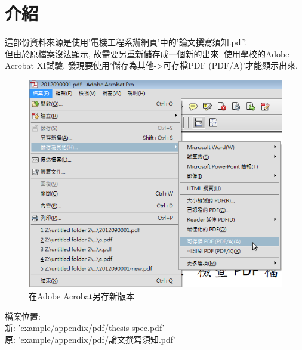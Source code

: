 
\section{介紹}
這部份資料來源是使用'電機工程系辦網頁'中的'論文撰寫須知.pdf'\cite{web:ncku:thesis-need-to-know}.\\

但由於原檔案沒法顯示, 故需要另重新儲存成一個新的出來. 使用學校的Adobe Acrobat XI試驗, 發現要使用'儲存為其他->可存檔PDF (PDF/A)'才能顯示出來.\\

\begin{figure}[h]
  \centering
  \includegraphics[scale=0.3]{./example/appendix/pic/save_pdf.png}
  \caption{在Adobe Acrobat另存新版本}
  \label{fig:appendix:save_pdf}
\end{figure}

檔案位置:\\
新: 'example/appendix/pdf/thesis-spec.pdf'\\
原: 'example/appendix/pdf/論文撰寫須知.pdf'\\



\EndChapter
